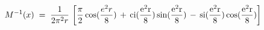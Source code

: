 \begin{equation}\label{eq:mx}
M^{-1}(x) \;=\; \frac{1}{2 \pi^2 r} \, 
\left[ 
\frac{\pi}{2} \cos(\frac{e^2r}{8}) \,+\, 
\rm{ci}(\frac{e^2r}{8})
\sin(\frac{e^2r}{8}) \,-\, \rm{si}(\frac{e^2r}{8}) 
\cos(\frac{e^2r}{8}) \right]
\end{equation}

